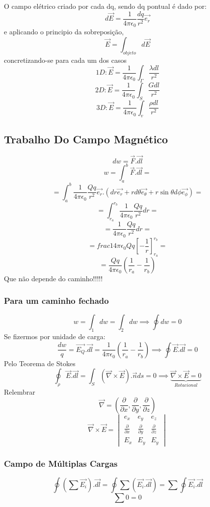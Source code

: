 \documentclass[a4paper]{article}
\begin{document}
O campo elétrico criado por cada dq, sendo dq pontual é dado por:
\[d\vec{E} = \frac{1}{4\pi\epsilon_0} \frac{dq}{r^2} \vec{e_r}\]
e aplicando o principio da sobreposição,
\[\vec{E}= \int_{objeto}{d\vec{E}}\]
concretizando-se para cada um dos casos
\[1D:        \vec{E} = \frac{1}{4\pi\epsilon_0} \int_{\Gamma}{\frac{\lambda dl}{r^2}} \]
\[2D:        \vec{E} = \frac{1}{4\pi\epsilon_0} \int_{S}{\frac{Gdl}{r^2}} \]
\[3D:        \vec{E} = \frac{1}{4\pi\epsilon_0} \int_{v}{\frac{\rho dl}{r^2}} \]

\subsection{Trabalho Do Campo Magnético}
\[dw = \vec{F}.\vec{dl}\]
\[w = \int_{a}^{b}\vec{F}.\vec{dl} =\]
\[=\int_{a}^{b}\frac{1}{4\pi\epsilon_0} \frac{Qq}{r^2}\vec{e_r}.(dr\vec{e_r}+ rd\theta\vec{e_\theta}+r\sin{\theta}d\phi\vec{e_\phi}) = \]
\[=\int_{r_a}^{r_b}\frac{1}{4\pi\epsilon_0}\frac{Qq}{r^2} dr =\]
\[=\frac{1}{4\pi\epsilon_0}\frac{Qq}{r^2} dr = \]
\[ = frac{1}{4\pi\epsilon_0}Qq {\left[-\frac{1}{r}\right]}_{r_a}^{r_b} =\]
\[=\frac{Qq}{4\pi\epsilon_0}\left(\frac{1}{r_a}-\frac{1}{r_b}\right)\]
Que não depende do caminho!!!!!

\subsubsection{Para um caminho fechado}
\[w = \int_{1}^{}dw = \int_{2}^{}dw \implies \oint{dw}=0 \]
Se fizermos por unidade de carga:
\[\frac{dw}{q} = \vec{E_Q}.\vec{dl}=\frac{1}{4\pi\epsilon_0}\left(\frac{1}{r_a}-\frac{1}{r_b}\right) \implies \oint{\vec{E}.\vec{dl}=0}\]
Pelo Teorema de Stokes
\[\oint_\rho{\vec{E}.\vec{dl}} = \int_{S}{\left(\vec{\nabla}\times\vec{E}\right).\vec{n}ds} = 0 \implies \underbrace{\vec{\nabla}\times\vec{E} = 0}_{Rotacional}\]
Relembrar
\[\vec{\nabla} = \left(\frac{\partial}{\partial x},\frac{\partial}{\partial y},\frac{\partial}{\partial z}\right)\]
\[\vec{\nabla}\times\vec{E}= 
\begin{vmatrix}
    e_x & e_y & e_z\\
    \frac{\partial}{\partial x} & \frac{\partial}{\partial y} & \frac{\partial}{\partial z}\\
    E_x & E_y & E_y
\end{vmatrix}\]
\subsubsection{Campo de Múltiplas Cargas}
\[\oint\left(\sum\vec{E_i}\right).\vec{dl} =\oint\sum\left(\vec{E_i}.\vec{dl}\right)= \sum\oint\vec{E_i}.\vec{dl}\]
\[\sum{0} = 0\]
\end{document}
